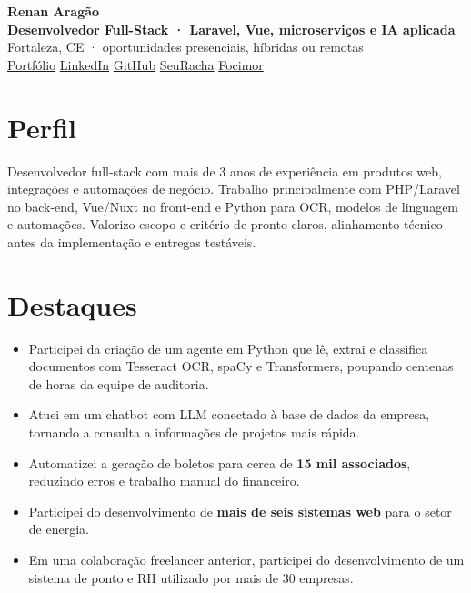 \documentclass[10pt,a4paper]{article}
\newcommand{\link}[2]{\href{#1}{\color{accent}#2}}
\begin{document}
\fontsize{9.4}{11.2}\selectfont

{\Huge\bfseries\color{ink} Renan Aragão}\\[3pt]
{\large\color{accent}\bfseries Desenvolvedor Full-Stack · Laravel, Vue, microserviços e IA aplicada}\\[3pt]
{\small\color{muted} Fortaleza, CE · oportunidades presenciais, híbridas ou remotas}\\[2pt]
{\small \link{https://renanaragao9.github.io/renanaragao9}{Portfólio} \quad
\link{https://linkedin.com/in/renan-aragao/}{LinkedIn} \quad
\link{https://github.com/renanaragao9}{GitHub} \quad
\link{https://seuracha.aragaolabs.com.br}{SeuRacha} \quad
\link{https://focimor.aragaolabs.com.br}{Focimor}}

\section{Perfil}
Desenvolvedor full-stack com mais de 3 anos de experiência em produtos web, integrações e automações de negócio. Trabalho principalmente com PHP/Laravel no back-end, Vue/Nuxt no front-end e Python para OCR, modelos de linguagem e automações. Valorizo escopo e critério de pronto claros, alinhamento técnico antes da implementação e entregas testáveis.

\section{Destaques}
\begin{itemize}
  \item Participei da criação de um agente em Python que lê, extrai e classifica documentos com Tesseract OCR, spaCy e Transformers, poupando centenas de horas da equipe de auditoria.
  \item Atuei em um chatbot com LLM conectado à base de dados da empresa, tornando a consulta a informações de projetos mais rápida.
  \item Automatizei a geração de boletos para cerca de \textbf{15 mil associados}, reduzindo erros e trabalho manual do financeiro.
  \item Participei do desenvolvimento de \textbf{mais de seis sistemas web} para o setor de energia.
  \item Em uma colaboração freelancer anterior, participei do desenvolvimento de um sistema de ponto e RH utilizado por mais de 30 empresas.
\end{itemize}
\end{document}
